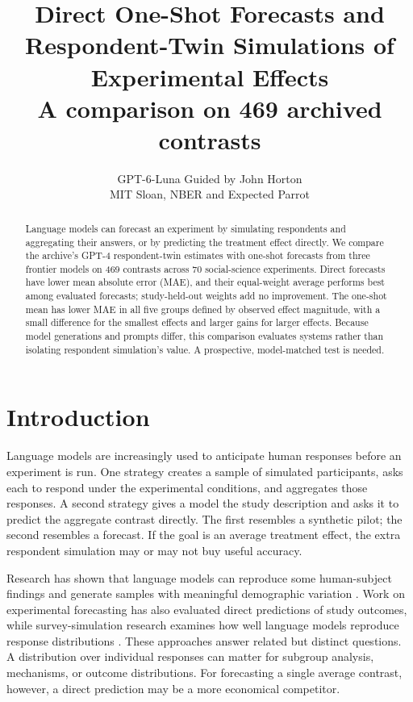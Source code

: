 \documentclass[11pt]{article}
\title{Direct One-Shot Forecasts and Respondent-Twin Simulations of Experimental Effects\\
\large A comparison on 469 archived contrasts}
\author{GPT-6-Luna Guided by John Horton\\\small MIT Sloan, NBER and Expected Parrot}
\date{}
\begin{document}
\maketitle


\begin{abstract}
Language models can forecast an experiment by simulating respondents and aggregating their answers, or by predicting the treatment effect directly. We compare the archive's GPT-4 respondent-twin estimates \cite{ashokkumar2026predict} with one-shot forecasts from three frontier models on 469 contrasts across 70 social-science experiments. Direct forecasts have lower mean absolute error (MAE), and their equal-weight average performs best among evaluated forecasts; study-held-out weights add no improvement. The one-shot mean has lower MAE in all five groups defined by observed effect magnitude, with a small difference for the smallest effects and larger gains for larger effects. Because model generations and prompts differ, this comparison evaluates systems rather than isolating respondent simulation's value. A prospective, model-matched test is needed.
\end{abstract}

\section{Introduction}
Language models are increasingly used to anticipate human responses before an experiment is run. One strategy creates a sample of simulated participants, asks each to respond under the experimental conditions, and aggregates those responses. A second strategy gives a model the study description and asks it to predict the aggregate contrast directly. The first resembles a synthetic pilot; the second resembles a forecast. If the goal is an average treatment effect, the extra respondent simulation may or may not buy useful accuracy.

Research has shown that language models can reproduce some human-subject findings and generate samples with meaningful demographic variation \citep{argyle2023out,aher2023simulate}. Work on experimental forecasting has also evaluated direct predictions of study outcomes, while survey-simulation research examines how well language models reproduce response distributions \citep{ashokkumar2026predict,cao2025specializing}. These approaches answer related but distinct questions. A distribution over individual responses can matter for subgroup analysis, mechanisms, or outcome distributions. For forecasting a single average contrast, however, a direct prediction may be a more economical competitor.
\end{document}
